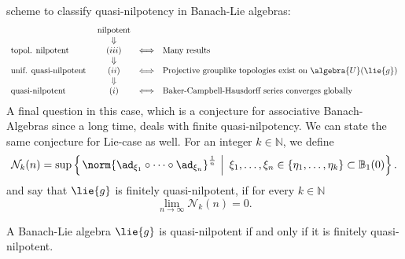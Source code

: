 \documentclass[
11pt,                          %
english                        %
]{article}
\begin{document}
scheme to classify quasi-nilpotency in Banach-Lie algebras:
\begin{equation}
	\label{classification}
	\begin{array}{lccl}
		& \text{nilpotent} &
		\\
		& \Downarrow &
		\\
		\text{topol. nilpotent } &
		(iii) & \Longleftrightarrow &
		\text{Many results}
		\\
		& \Downarrow &
		\\
		\text{unif. quasi-nilpotent } &
		(ii) & \Longleftrightarrow &
		\text{Projective grouplike topologies exist on }
		\algebra{U}(\lie{g})
		\\
		& \Downarrow &
		\\
		\text{quasi-nilpotent } &
		(i) & \Longleftrightarrow &
		\text{Baker-Campbell-Hausdorff series converges globally}
	\end{array}
\end{equation}
A final question in this case, which is a conjecture for associative Banach-Algebras 
since a long time, deals with finite quasi-nilpotency. We can state the same 
conjecture for Lie-case as well. For an integer $k \in \mathbb{N}$, we define
\begin{equation}
	\mathcal{N}_k(n)
	=
	\sup \left\{ 
	\left.
		\norm{ \ad_{\xi_1} \circ \cdots \circ \ad_{\xi_n} }^{\frac{1}{n}} 
	\ \right| \
		\xi_1, \ldots, \xi_n 
		\in 
		\{\eta_1, \ldots, \eta_k \}
		\subset 
		\mathbb{B}_1(0)
	\right\}.
\end{equation}
and say that $\lie{g}$ is finitely quasi-nilpotent, if for every $k \in \mathbb{N}$
\begin{equation}
	\lim\limits_{n \rightarrow \infty}
	\mathcal{N}_k(n)
	=
	0.
\end{equation}
\begin{conjecture}
	A Banach-Lie algebra $\lie{g}$ is quasi-nilpotent if and only if it is finitely 
	quasi-nilpotent.
\end{conjecture}
\end{document}
